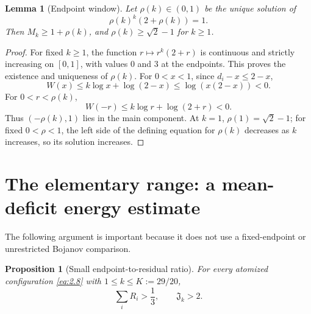 \documentclass[11pt]{article}
\numberwithin{equation}{section}
\theoremstyle{plain}
\newtheorem{lemma}[theorem]{Lemma}
\newtheorem{proposition}[theorem]{Proposition}
\theoremstyle{definition}
\theoremstyle{remark}
\newcommand{\1}{\mathbf 1}
\newcommand{\J}{\mathfrak J}
\begin{document}
\begin{lemma}[Endpoint window]\label{lem:window}
Let $\rho(k)\in(0,1)$ be the unique solution of
\[
 \rho(k)^k(2+\rho(k))=1.
\]
Then $M_k\ge1+\rho(k)$, and $\rho(k)\ge\sqrt2-1$ for $k\ge1$.
\end{lemma}

\begin{proof}
For fixed $k\ge1$, the function $r\mapsto r^k(2+r)$ is continuous and
strictly increasing on $[0,1]$, with values $0$ and $3$ at the endpoints.
This proves the existence and uniqueness of $\rho(k)$.
For $0<x<1$, since $d_i-x\le2-x$,
\[
 W(x)\le k\log x+\log(2-x)\le\log(x(2-x))<0.
\]
For $0<r<\rho(k)$,
\[
 W(-r)\le k\log r+\log(2+r)<0.
\]
Thus $(-\rho(k),1)$ lies in the main component.  At $k=1$,
$\rho(1)=\sqrt2-1$; for fixed $0<\rho<1$, the left side of the defining equation for $\rho(k)$
decreases as $k$ increases, so its solution increases.
\end{proof}

\section{The elementary range: a mean-deficit energy estimate}

The following argument is important because it does not use a
fixed-endpoint or unrestricted Bojanov comparison.

\begin{proposition}[Small endpoint-to-residual ratio]\label{prop:lowk}
For every atomized configuration \eqref{eq:2.8} with
$1\le k\le K:=29/20$,
\[
 \sum_iR_i>\frac13,\qquad \J_k>2.
\]
\end{proposition}
\end{document}
